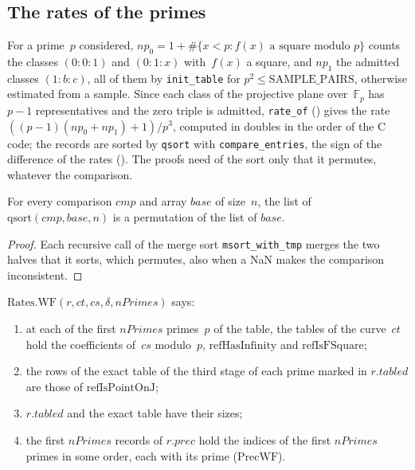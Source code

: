 \subsection{The rates of the primes}

For a prime~$p$ considered, $\mathit{np}_0 = 1 + \#\{x < p : f(x) \text{ a square modulo } p\}$
counts the classes $(0 : 0 : 1)$ and $(0 : 1 : x)$ with~$f(x)$ a square, and $\mathit{np}_1$ the
admitted classes $(1 : b : c)$, all of them by \texttt{init\_table} for
$p^2 \le \mathrm{SAMPLE\_PAIRS}$, otherwise estimated from a sample. Since each class of the
projective plane over~$\mathbb{F}_p$ has~$p - 1$ representatives and the zero triple is admitted,
\texttt{rate\_of} () gives the rate
$((p - 1)(\mathit{np}_0 + \mathit{np}_1) + 1) / p^3$, computed in doubles in the order of the C
code; the records are sorted by \texttt{qsort} with \texttt{compare\_entries}, the sign of the
difference of the rates (). The proofs need of the sort only that it
permutes, whatever the comparison.

\begin{lemma}\label{lem:toList_qsort_perm}
  \leanok
  For every comparison $\mathit{cmp}$ and array $\mathit{base}$ of size~$n$, the list of
  $\mathrm{qsort}(\mathit{cmp}, \mathit{base}, n)$ is a permutation of the list of $\mathit{base}$.
\end{lemma}

\begin{proof}
  \leanok
  Each recursive call of the merge sort \texttt{msort\_with\_tmp} merges the two halves that it
  sorts, which permutes, also when a NaN makes the comparison inconsistent.
\end{proof}


\begin{definition}\label{def:Rates.WF}
  \leanok
  $\mathrm{Rates.WF}(r, \mathit{ct}, \mathit{cs}, \delta, \mathit{nPrimes})$ says:
  \begin{enumerate}
    \item at each of the first $\mathit{nPrimes}$ primes~$p$ of the table, the tables of the
      curve~$\mathit{ct}$ hold the coefficients of~$\mathit{cs}$ modulo~$p$,
      $\mathrm{refHasInfinity}$ and $\mathrm{refIsFSquare}$;
    \item the rows of the exact table of the third stage of each prime marked in $\mathit{r.tabled}$
      are those of $\mathrm{refIsPointOnJ}$;
    \item $\mathit{r.tabled}$ and the exact table have their sizes;
    \item the first $\mathit{nPrimes}$ records of $\mathit{r.prec}$ hold the indices of the first
      $\mathit{nPrimes}$ primes in some order, each with its prime
      ($\mathrm{PrecWF}$).
  \end{enumerate}
\end{definition}

